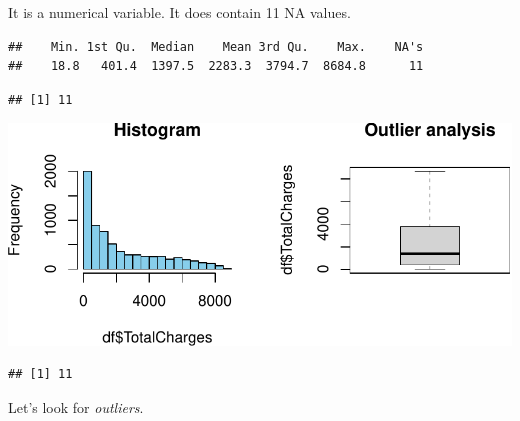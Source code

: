\documentclass[
  twoside]{article}
\newenvironment{Shaded}{\begin{snugshade}}{\end{snugshade}}
\newcommand{\CommentTok}[1]{\textcolor[rgb]{0.56,0.35,0.01}{\textit{#1}}}
\newcommand{\FloatTok}[1]{\textcolor[rgb]{0.00,0.00,0.81}{#1}}
\newcommand{\FunctionTok}[1]{\textcolor[rgb]{0.00,0.00,0.00}{#1}}
\newcommand{\NormalTok}[1]{#1}
\newcommand{\OtherTok}[1]{\textcolor[rgb]{0.56,0.35,0.01}{#1}}
\newcommand{\SpecialCharTok}[1]{\textcolor[rgb]{0.00,0.00,0.00}{#1}}
\newcommand{\StringTok}[1]{\textcolor[rgb]{0.31,0.60,0.02}{#1}}
\begin{document}
It is a numerical variable. It does contain 11 NA values.

\begin{verbatim}
##    Min. 1st Qu.  Median    Mean 3rd Qu.    Max.    NA's 
##    18.8   401.4  1397.5  2283.3  3794.7  8684.8      11
\end{verbatim}

\begin{verbatim}
## [1] 11
\end{verbatim}

\includegraphics{Assigment2_files/figure-latex/unnamed-chunk-35-1.pdf}

\begin{verbatim}
## [1] 11
\end{verbatim}

Let's look for \emph{outliers}.

\begin{Shaded}
\end{Shaded}
\end{document}
